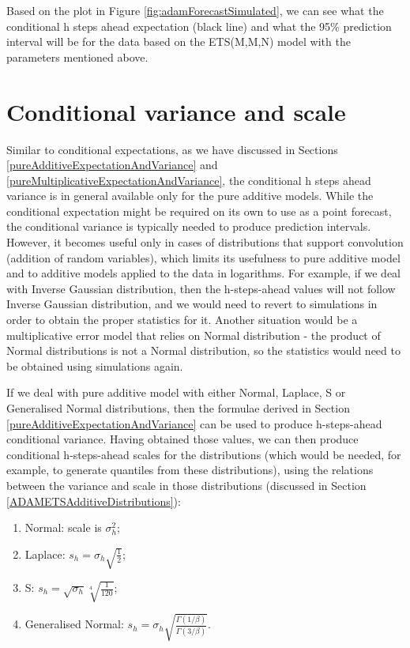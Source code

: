 \documentclass[
]{book}
\providecommand{\tightlist}{%
  \setlength{\itemsep}{0pt}\setlength{\parskip}{0pt}}
\theoremstyle{definition}
\theoremstyle{definition}
\theoremstyle{definition}
\theoremstyle{definition}
\theoremstyle{remark}
\begin{document}
Based on the plot in Figure \ref{fig:adamForecastSimulated}, we can see what the conditional h steps ahead expectation (black line) and what the 95\% prediction interval will be for the data based on the ETS(M,M,N) model with the parameters mentioned above.

\hypertarget{ADAMForecastingVariance}{%
\section{Conditional variance and scale}\label{ADAMForecastingVariance}}

Similar to conditional expectations, as we have discussed in Sections \ref{pureAdditiveExpectationAndVariance} and \ref{pureMultiplicativeExpectationAndVariance}, the conditional h steps ahead variance is in general available only for the pure additive models. While the conditional expectation might be required on its own to use as a point forecast, the conditional variance is typically needed to produce prediction intervals. However, it becomes useful only in cases of distributions that support convolution (addition of random variables), which limits its usefulness to pure additive model and to additive models applied to the data in logarithms. For example, if we deal with Inverse Gaussian distribution, then the h-steps-ahead values will not follow Inverse Gaussian distribution, and we would need to revert to simulations in order to obtain the proper statistics for it. Another situation would be a multiplicative error model that relies on Normal distribution - the product of Normal distributions is not a Normal distribution, so the statistics would need to be obtained using simulations again.

If we deal with pure additive model with either Normal, Laplace, S or Generalised Normal distributions, then the formulae derived in Section \ref{pureAdditiveExpectationAndVariance} can be used to produce h-steps-ahead conditional variance. Having obtained those values, we can then produce conditional h-steps-ahead scales for the distributions (which would be needed, for example, to generate quantiles from these distributions), using the relations between the variance and scale in those distributions (discussed in Section \ref{ADAMETSAdditiveDistributions}):

\begin{enumerate}
\def\labelenumi{\arabic{enumi}.}
\tightlist
\item
  Normal: scale is \(\sigma^2_h\);
\item
  Laplace: \(s_h = \sigma_h \sqrt{\frac{1}{2}}\);
\item
  S: \(s_h = \sqrt{\sigma_h}\sqrt[4]{\frac{1}{120}}\);
\item
  Generalised Normal: \(s_h = \sigma_h \sqrt{\frac{\Gamma(1/\beta)}{\Gamma(3/\beta)}}\).
\end{enumerate}
\end{document}
